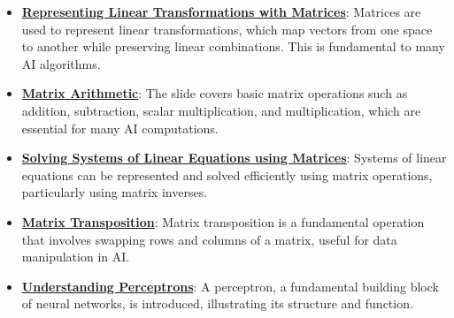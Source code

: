 \documentclass{article}%
\begin{document}
\begin{itemize}[leftmargin=*]%
\item \href{\url{https://purdue.brightspace.com/d2l/common/assets/pdfjs-d2l-dist/1.0.14-legacy/web/viewer.html?file=\%252Fcontent\%252Fenforced\%252F1095467-wl.202510.CS.24300.001\%252F04L1-Linear\%20Algebra\%20Primer.pdf\%253Fou\%253D1095467\&lang=en-us\&container=d2l-fileviewer-rendered-pdf\&fullscreen=d2l-fileviewer-rendered-pdf-dialog\&height=667}#page=5}{\textbf{Representing Linear Transformations with Matrices}}: Matrices are used to represent linear transformations, which map vectors from one space to another while preserving linear combinations. This is fundamental to many AI algorithms.%
\item \href{\url{https://purdue.brightspace.com/d2l/common/assets/pdfjs-d2l-dist/1.0.14-legacy/web/viewer.html?file=\%252Fcontent\%252Fenforced\%252F1095467-wl.202510.CS.24300.001\%252F04L1-Linear\%20Algebra\%20Primer.pdf\%253Fou\%253D1095467\&lang=en-us\&container=d2l-fileviewer-rendered-pdf\&fullscreen=d2l-fileviewer-rendered-pdf-dialog\&height=667}#page=9}{\textbf{Matrix Arithmetic}}: The slide covers basic matrix operations such as addition, subtraction, scalar multiplication, and multiplication, which are essential for many AI computations.%
\item \href{\url{https://purdue.brightspace.com/d2l/common/assets/pdfjs-d2l-dist/1.0.14-legacy/web/viewer.html?file=\%252Fcontent\%252Fenforced\%252F1095467-wl.202510.CS.24300.001\%252F04L1-Linear\%20Algebra\%20Primer.pdf\%253Fou\%253D1095467\&lang=en-us\&container=d2l-fileviewer-rendered-pdf\&fullscreen=d2l-fileviewer-rendered-pdf-dialog\&height=667}#page=11}{\textbf{Solving Systems of Linear Equations using Matrices}}: Systems of linear equations can be represented and solved efficiently using matrix operations, particularly using matrix inverses.%
\item \href{\url{https://purdue.brightspace.com/d2l/common/assets/pdfjs-d2l-dist/1.0.14-legacy/web/viewer.html?file=\%252Fcontent\%252Fenforced\%252F1095467-wl.202510.CS.24300.001\%252F04L1-Linear\%20Algebra\%20Primer.pdf\%253Fou\%253D1095467\&lang=en-us\&container=d2l-fileviewer-rendered-pdf\&fullscreen=d2l-fileviewer-rendered-pdf-dialog\&height=667}#page=16}{\textbf{Matrix Transposition}}: Matrix transposition is a fundamental operation that involves swapping rows and columns of a matrix, useful for data manipulation in AI.%
\item \href{\url{https://purdue.brightspace.com/d2l/common/assets/pdfjs-d2l-dist/1.0.14-legacy/web/viewer.html?file=\%252Fcontent\%252Fenforced\%252F1095467-wl.202510.CS.24300.001\%252F04L1-Linear\%20Algebra\%20Primer.pdf\%253Fou\%253D1095467\&lang=en-us\&container=d2l-fileviewer-rendered-pdf\&fullscreen=d2l-fileviewer-rendered-pdf-dialog\&height=667}#page=17}{\textbf{Understanding Perceptrons}}: A perceptron, a fundamental building block of neural networks, is introduced, illustrating its structure and function.%

\end{itemize}
\end{document}
